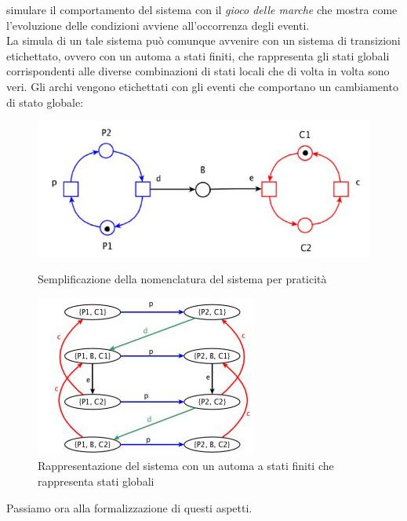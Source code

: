 \documentclass[a4paper,12pt, oneside]{book}
\begin{document}
\begin{esempio}
{    simulare il comportamento del sistema con il \textit{gioco delle marche} che
    mostra come l'evoluzione delle condizioni avviene all'occorrenza degli
    eventi.} \\
  La simula di un tale sistema può comunque avvenire con un sistema di
  transizioni etichettato, ovvero con un automa a stati finiti, che rappresenta
  gli stati globali corrispondenti alle diverse combinazioni di stati locali che
  di volta in volta sono veri. Gli archi vengono etichettati con gli eventi che
  comportano un cambiamento di stato globale:
  \begin{figure}[H]
    \centering
    \includegraphics[scale = 0.4]{img/prod3.jpg}
    \caption{Semplificazione della nomenclatura del sistema per praticità}
    \includegraphics[scale = 0.8]{img/prod2.jpg}
    \caption{Rappresentazione del sistema con un automa a stati finiti che
      rappresenta stati globali}
  \end{figure}
\end{esempio}
Passiamo ora alla formalizzazione di questi aspetti.\\
\end{document}

